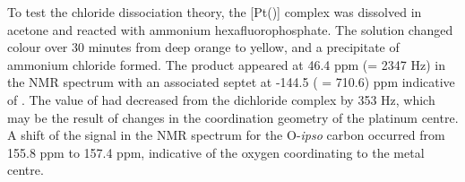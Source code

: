 To test the chloride dissociation theory, the [Pt(\tButhixantphos)] complex was dissolved in acetone and reacted with ammonium hexafluorophosphate.  The solution changed colour over 30 minutes from deep orange to yellow, and a precipitate of ammonium chloride formed.  The product appeared at 46.4 ppm (\JPtP = 2347 Hz) in the \phosphorus{} NMR spectrum with an associated septet at -144.5 (\JPF{} = 710.6) ppm indicative of .  The value of \JPtP{} had decreased from the dichloride complex by 353 Hz, which may be the result of changes in the coordination geometry of the platinum centre.  A shift of the signal in the \carbon{} NMR spectrum for the O-\emph{ipso} carbon occurred from 155.8 ppm to 157.4 ppm, indicative of the oxygen coordinating to the metal centre.






